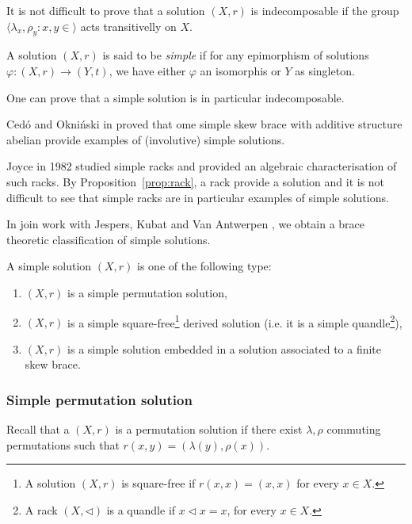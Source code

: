 It is not difficult to prove that a solution $(X,r)$ is indecomposable if the group $\langle \lambda_x, \rho_y \colon x, y \in \rangle$ acts transitivelly on $X$.

\begin{definition}
    A solution $(X,r)$ is said to be \emph{simple} if for any epimorphism of solutions $\varphi: (X,r) \to (Y,t)$, we have either $\varphi$ an isomorphis or $Y$ as singleton.
\end{definition}

One can prove that a simple solution is in particular indecomposable. 

Cedó and Okniński in \cite{} proved that ome simple skew brace with additive structure abelian provide examples of (involutive) simple solutions. 

Joyce in 1982 studied simple racks and provided an algebraic characterisation of such racks. By Proposition~\ref{prop:rack}, a rack provide a solution and it is not difficult to see that simple racks are in particular examples of simple solutions. 

In join work with Jespers, Kubat and Van Antwerpen \cite{}, we obtain a brace theoretic classification of simple solutions. 

\begin{theorem}
    A simple solution $(X,r)$ is one of the following type:
    \begin{enumerate}
        \item $(X,r)$ is a simple permutation solution,
        \item $(X,r)$ is a simple square-free\footnote{A solution $(X,r)$ is square-free if $r(x,x)=(x,x)$ for every $x\in X$.} derived solution (i.e. it is a simple quandle\footnote{A rack $(X,\triangleleft)$ is a quandle if $x\triangleleft x = x$, for every $x\in X$.}),
        \item $(X,r)$ is a simple solution embedded in a solution associated to a finite skew brace. 
    \end{enumerate}
\end{theorem}

\subsubsection{Simple permutation solution}

Recall that a $(X,r)$ is a permutation solution if there exist $\lambda,\rho$ commuting permutations such that $r(x,y)=(\lambda(y),\rho(x))$.

